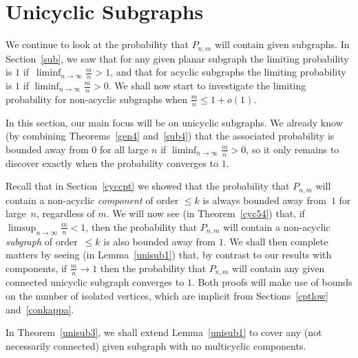 \documentclass{article}
\newtheorem{Proof of Theorem}{Proof of Theorem}
\begin{document}
\newpage
\section{Unicyclic Subgraphs} \label{cycsub}















We continue to look at the probability that $P_{n,m}$ will contain given subgraphs.
In Section~\ref{sub},
we saw that for any given planar subgraph the limiting probability is $1$ if~$\liminf_{n \to \infty} \frac{m}{n}>1$,
and that for acyclic subgraphs the limiting probability is $1$ if $\liminf_{n \to \infty} \frac{m}{n} >0$.
We shall now start to investigate the limiting probability for non-acyclic subgraphs when $\frac{m}{n} \leq 1+o(1)$.

In this section,
our main focus will be on unicyclic subgraphs.
We already know 
(by combining Theorems~\ref{gen4} and~\ref{sub4})
that the associated probability is bounded away from $0$ for all large $n$
if $\liminf_{n \to \infty} \frac{m}{n} >0$,
so it only remains to discover exactly when the probability converges to $1$.


Recall that in Section~\ref{cyccpt}
we showed that the probability that $P_{n,m}$ will contain a non-acyclic \textit{component} of order $\leq k$ 
is always bounded away from~$1$ for large~$n$, 
regardless of $m$.
We will now see (in Theorem~\ref{cyc54}) that,
if $\limsup_{n \to \infty} \frac{m}{n} <1$,
then the probability that $P_{n,m}$ will contain a non-acyclic \textit{subgraph} of order~$\leq k$
is also bounded away from $1$. 
We shall then complete matters by seeing 
(in Lemma~\ref{unisub1}) that,
by contrast to our results with components,
if $\frac{m}{n} \to 1$ then the probability that $P_{n,m}$ 
will contain any given connected unicyclic subgraph converges to $1$. 
Both proofs will make use of bounds on the number of isolated vertices,
which are implicit from Sections~\ref{cptlow} and~\ref{conkappa}.

In Theorem~\ref{unisub3},
we shall extend Lemma~\ref{unisub1} to cover any (not necessarily connected) given subgraph with no multicyclic components.
\end{document}
